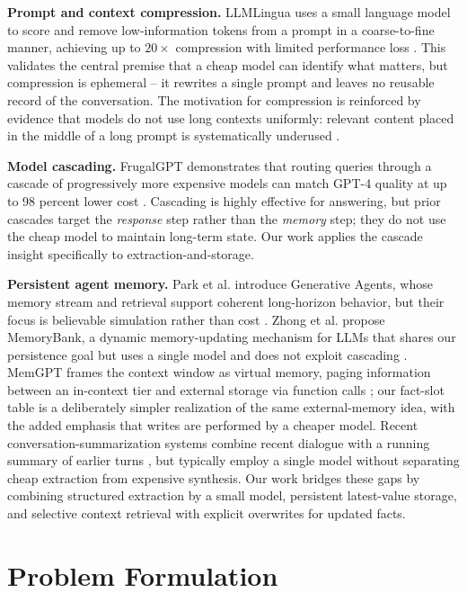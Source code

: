 \documentclass[conference]{IEEEtran}
\begin{document}
\textbf{Prompt and context compression.} LLMLingua uses a small language model to score and remove low-information tokens from a prompt in a coarse-to-fine manner, achieving up to $20\times$ compression with limited performance loss \cite{jiang2023llmlingua}. This validates the central premise that a cheap model can identify what matters, but compression is ephemeral -- it rewrites a single prompt and leaves no reusable record of the conversation. The motivation for compression is reinforced by evidence that models do not use long contexts uniformly: relevant content placed in the middle of a long prompt is systematically underused \cite{nfliu2023lost}.

\textbf{Model cascading.} FrugalGPT demonstrates that routing queries through a cascade of progressively more expensive models can match GPT-4 quality at up to 98 percent lower cost \cite{chen2023frugalgpt}. Cascading is highly effective for answering, but prior cascades target the \emph{response} step rather than the \emph{memory} step; they do not use the cheap model to maintain long-term state. Our work applies the cascade insight specifically to extraction-and-storage.

\textbf{Persistent agent memory.} Park et al. introduce Generative Agents, whose memory stream and retrieval support coherent long-horizon behavior, but their focus is believable simulation rather than cost \cite{park2023generative}. Zhong et al. propose MemoryBank, a dynamic memory-updating mechanism for LLMs that shares our persistence goal but uses a single model and does not exploit cascading \cite{zhong2024memorybank}. MemGPT frames the context window as virtual memory, paging information between an in-context tier and external storage via function calls \cite{packer2023memgpt}; our fact-slot table is a deliberately simpler realization of the same external-memory idea, with the added emphasis that writes are performed by a cheaper model. Recent conversation-summarization systems combine recent dialogue with a running summary of earlier turns \cite{sung2024wmt}, but typically employ a single model without separating cheap extraction from expensive synthesis. Our work bridges these gaps by combining structured extraction by a small model, persistent latest-value storage, and selective context retrieval with explicit overwrites for updated facts.

\section{Problem Formulation}
\label{sec:problem}
\end{document}
